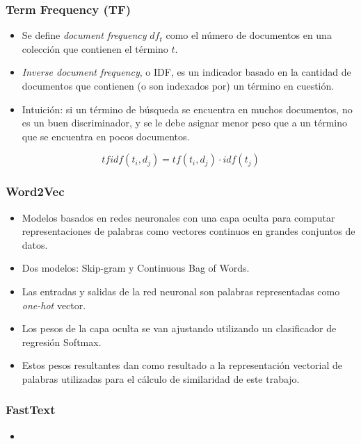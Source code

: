 \begin{frame}
	\frametitle{Term Frequency (TF)}
	\begin{itemize}
		\scriptsize
		\item Se define \textit{document frequency} \(df_t\) como el número de documentos en una colección que contienen el término \(t\).
		\item \textit{Inverse document frequency}, o IDF, es un indicador basado en la cantidad de documentos que contienen (o son indexados por) un término en cuestión.
		\item Intuición: si un término de búsqueda se encuentra en muchos documentos, no es un buen discriminador, y se le debe asignar menor peso que a un término que se encuentra en pocos documentos.
	\end{itemize}

	\bigskip
	\centering
	\[tfidf(t_i, d_j) = tf(t_i, d_j) \cdot idf(t_j)\]
\end{frame}

\begin{frame}
	\frametitle{Word2Vec}
	\begin{itemize}
		\scriptsize
		\item Modelos basados en redes neuronales con una capa oculta para computar representaciones de palabras como vectores continuos en grandes conjuntos de datos.
		\item Dos modelos: Skip-gram y Continuous Bag of Words.
		\item Las entradas y salidas de la red neuronal son palabras representadas como \textit{one-hot} vector.
		\item Los pesos de la capa oculta se van ajustando utilizando un clasificador de regresión Softmax.
		\item Estos pesos resultantes dan como resultado a la representación vectorial de palabras utilizadas para el cálculo de similaridad de este trabajo.
	\end{itemize}
\end{frame}

\begin{frame}
	\frametitle{FastText}
	\begin{itemize}
		\scriptsize
		\item
	\end{itemize}
\end{frame}